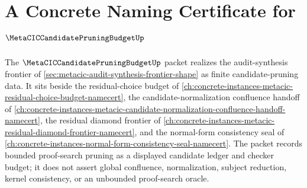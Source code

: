 \chapter{A Concrete Naming Certificate for $\MetaCICCandidatePruningBudgetUp$}
\label{ch:concrete-instances-metacic-candidate-pruning-budget-namecert}

The $\MetaCICCandidatePruningBudgetUp$ packet realizes the audit-synthesis frontier of \autoref{sec:metacic-audit-synthesis-frontier-shape} as finite candidate-pruning data. It sits beside the residual-choice budget of \autoref{ch:concrete-instances-metacic-residual-choice-budget-namecert}, the candidate-normalization confluence handoff of \autoref{ch:concrete-instances-metacic-candidate-normalization-confluence-handoff-namecert}, the residual diamond frontier of \autoref{ch:concrete-instances-metacic-residual-diamond-frontier-namecert}, and the normal-form consistency seal of \autoref{ch:concrete-instances-normal-form-consistency-seal-namecert}. The packet records bounded proof-search pruning as a displayed candidate ledger and checker budget; it does not assert global confluence, normalization, subject reduction, kernel consistency, or an unbounded proof-search oracle.

